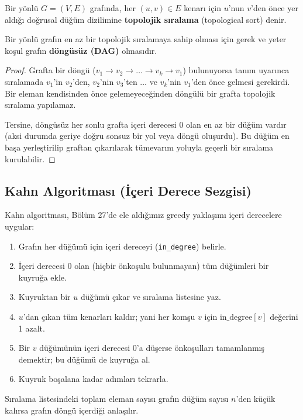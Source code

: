 \begin{definition}
Bir yönlü $G=(V, E)$ grafında, her $(u, v) \in E$ kenarı için $u$'nun $v$'den önce yer aldığı doğrusal düğüm dizilimine \textbf{topolojik sıralama} (topological sort) denir.
\end{definition}

\begin{theorem}
Bir yönlü grafın en az bir topolojik sıralamaya sahip olması için gerek ve yeter koşul grafın \textbf{döngüsüz (DAG)} olmasıdır.
\end{theorem}
\begin{proof}
Grafta bir döngü ($v_1 \to v_2 \to \dots \to v_k \to v_1$) bulunuyorsa tanım uyarınca sıralamada $v_1$'in $v_2$'den, $v_2$'nin $v_3$'ten $\dots$ ve $v_k$'nin $v_1$'den önce gelmesi gerekirdi. Bir eleman kendisinden önce gelemeyeceğinden döngülü bir grafta topolojik sıralama yapılamaz.

Tersine, döngüsüz her sonlu grafta içeri derecesi 0 olan en az bir düğüm vardır (aksi durumda geriye doğru sonsuz bir yol veya döngü oluşurdu). Bu düğüm en başa yerleştirilip graftan çıkarılarak tümevarım yoluyla geçerli bir sıralama kurulabilir.
\end{proof}

\subsection{Kahn Algoritması (İçeri Derece Sezgisi)}
Kahn algoritması, Bölüm 27'de ele aldığımız greedy yaklaşımı içeri derecelere uygular:
\begin{enumerate}
    \item Grafın her düğümü için içeri dereceyi (\texttt{in\_degree}) belirle.
    \item İçeri derecesi $0$ olan (hiçbir önkoşulu bulunmayan) tüm düğümleri bir kuyruğa ekle.
    \item Kuyruktan bir $u$ düğümü çıkar ve sıralama listesine yaz.
    \item $u$'dan çıkan tüm kenarları kaldır; yani her komşu $v$ için $\text{in\_degree}[v]$ değerini 1 azalt.
    \item Bir $v$ düğümünün içeri derecesi 0'a düşerse önkoşulları tamamlanmış demektir; bu düğümü de kuyruğa al.
    \item Kuyruk boşalana kadar adımları tekrarla.
\end{enumerate}

Sıralama listesindeki toplam eleman sayısı grafın düğüm sayısı $n$'den küçük kalırsa grafın döngü içerdiği anlaşılır.

